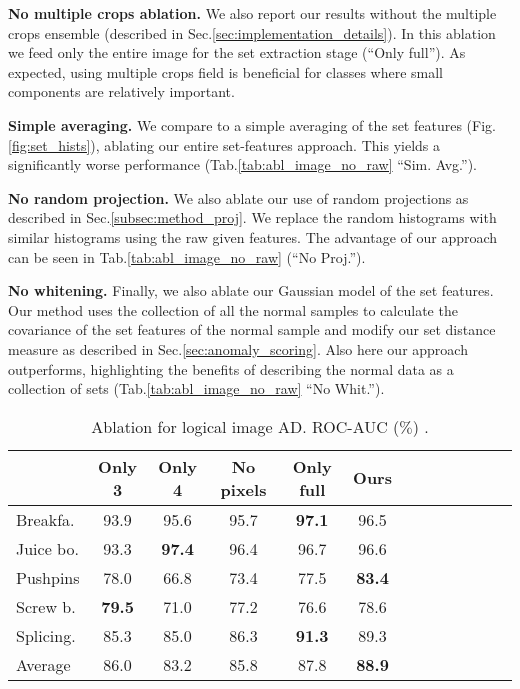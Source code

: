 \documentclass{article}
\begin{document}
\textbf{No multiple crops ablation.} We also report our results without the multiple crops ensemble (described in Sec.\ref{sec:implementation_details}). In this ablation we feed only the entire image for the set extraction stage (``Only full''). As expected, using multiple crops field is beneficial for classes where small components are relatively important.

\textbf{Simple averaging.}
We compare to a simple averaging of the set features (Fig. \ref{fig:set_hists}), ablating our entire set-features approach. This yields a significantly worse performance (Tab.\ref{tab:abl_image_no_raw} ``Sim. Avg.'').


\textbf{No random projection.} We also ablate our use of random projections as described in Sec.\ref{subsec:method_proj}. We replace the random histograms with similar histograms using the raw given features. The advantage of our approach can be seen in Tab.\ref{tab:abl_image_no_raw} (``No Proj.''). 



\textbf{No whitening.}
Finally, we also ablate our Gaussian model of the set features. Our method uses the collection of all the normal samples to calculate the covariance of the set features of the normal sample and modify our set distance measure as described in Sec.\ref{sec:anomaly_scoring}. Also here our approach outperforms, highlighting the benefits of describing the normal data as a collection of sets (Tab.\ref{tab:abl_image_no_raw} ``No Whit.'').

 
\begin{table}
\caption{Ablation for logical image AD. ROC-AUC  ($\%$) .}
\centering
\small
\begin{tabular}{lcccccccccccc}
\toprule

	&	Only 3	&	Only 4	&	No pixels	&	Only full	& Ours 	\\
 \toprule

Breakfa.	&	93.9	&	95.6	&	95.7	&	\textbf{97.1}	&	96.5	\\
Juice bo.	&	93.3	&	\textbf{97.4}	&	96.4	&	96.7	&	96.6	\\
Pushpins	&	78.0	&	66.8	&	73.4	&	77.5	&	\textbf{83.4}	\\
Screw b.	&	\textbf{79.5}	&	71.0	&	77.2	&	76.6	&	78.6	\\
Splicing.	&	85.3	&	85.0	&	86.3	&	\textbf{91.3}	&	89.3	\\
\midrule											
Average	&	86.0	&	83.2	&	85.8	&	87.8	&	\textbf{88.9}	\\



 
\bottomrule
\end{tabular}
\label{tab:abl_image}
\end{table}
\end{document}
